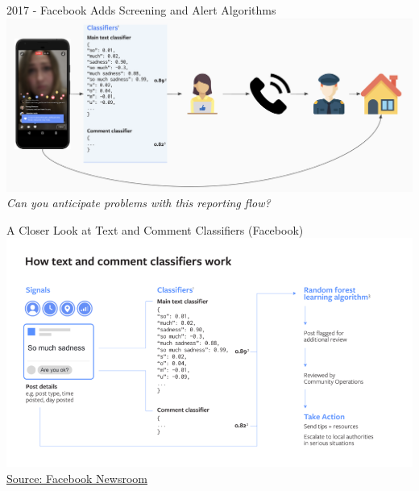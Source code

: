 \documentclass[nobackground,dvipsnames,table]{beamer}
\begin{document}
\begin{frame}{2017 - Facebook Adds Screening and Alert Algorithms}
    \includegraphics[width=\textwidth]{potentially-problematic-reporting-flow}
    \centering
    \small
    \textit{Can you anticipate problems with this reporting flow?}
\end{frame}

\begin{frame}{A Closer Look at Text and Comment Classifiers (Facebook)}
    \includegraphics[width=\textwidth]{text-and-comment-classifiers}
    \small
    \href{https://about.fb.com/news/2018/09/inside-feed-suicide-prevention-and-ai/}{Source: Facebook Newsroom}
\end{frame}
\end{document}

